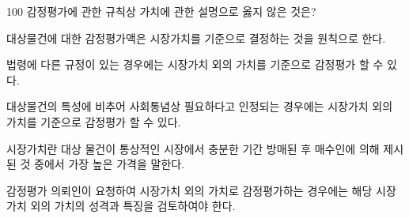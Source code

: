 \begin{question}{100}
감정평가에 관한 규칙상 가치에 관한 설명으로 옳지 않은 것은?
\begin{choices}
  \item 대상물건에 대한 감정평가액은 시장가치를 기준으로 결정하는 것을 원칙으로 한다.
  \item 법령에 다른 규정이 있는 경우에는 시장가치 외의 가치를 기준으로 감정평가 할 수 있다.
  \item 대상물건의 특성에 비추어 사회통념상 필요하다고 인정되는 경우에는 시장가치 외의 가치를 기준으로 감정평가 할 수 있다.
  \item 시장가치란 대상 물건이 통상적인 시장에서 충분한 기간 방매된 후 매수인에 의해 제시된 것 중에서 가장 높은 가격을 말한다.
  \item 감정평가 의뢰인이 요청하여 시장가치 외의 가치로 감정평가하는 경우에는 해당 시장가치 외의 가치의 성격과 특징을 검토하여야 한다.
\end{choices}
\end{question}
